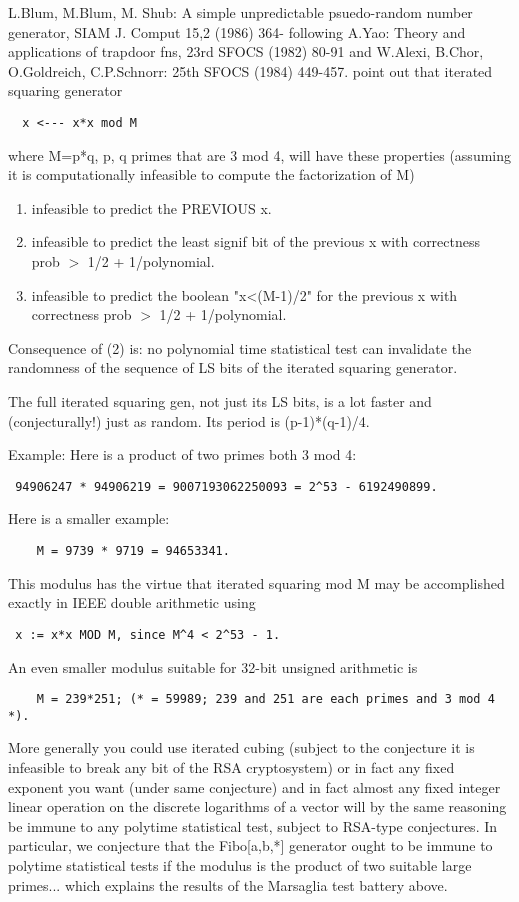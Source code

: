 L.Blum, M.Blum, M. Shub: A simple unpredictable psuedo-random
number generator, SIAM J. Comput 15,2 (1986) 364-
following
A.Yao: Theory and applications of trapdoor fns, 23rd SFOCS (1982) 80-91
and
W.Alexi, B.Chor, O.Goldreich, C.P.Schnorr: 25th SFOCS (1984) 449-457.
point out that iterated squaring generator
\begin{verbatim}
  x <--- x*x mod M
\end{verbatim}
where M=p*q, p, q primes that are 3 mod 4, will have these properties
(assuming it is computationally infeasible to compute the factorization of M)
\begin{enumerate}
\item infeasible to predict the PREVIOUS x.
\item infeasible to predict the least signif bit of the
    previous x with correctness prob $>$ 1/2 + 1/polynomial.
\item infeasible to predict the boolean "x<(M-1)/2" for the
    previous x with correctness prob $>$ 1/2 + 1/polynomial.
\end{enumerate}
Consequence of (2) is: no polynomial time statistical test
can invalidate the randomness of the sequence of LS bits of
the iterated squaring generator. 

The full iterated squaring gen, not just its LS bits,
is a lot faster and (conjecturally!) just as random.
Its period is (p-1)*(q-1)/4.

Example: Here is a product of two primes both 3 mod 4:
\begin{verbatim}
 94906247 * 94906219 = 9007193062250093 = 2^53 - 6192490899.
\end{verbatim}
Here is a smaller example:
\begin{verbatim}
    M = 9739 * 9719 = 94653341.
\end{verbatim}
This modulus has the virtue that iterated squaring mod M
may be accomplished exactly in IEEE double arithmetic using
\begin{verbatim}
 x := x*x MOD M, since M^4 < 2^53 - 1.
\end{verbatim}
An even smaller modulus suitable for 32-bit unsigned arithmetic is
\begin{verbatim}
    M = 239*251; (* = 59989; 239 and 251 are each primes and 3 mod 4 *).
\end{verbatim}

More generally you could use iterated cubing (subject to the conjecture
it is infeasible to break any bit of the RSA cryptosystem) or in fact
any fixed exponent you want (under same conjecture) and in fact almost
any fixed integer linear operation on the discrete logarithms of a vector
will by the same reasoning be immune to any polytime statistical test,
subject to RSA-type conjectures. In particular, we conjecture that the
Fibo[a,b,*] generator ought to be immune to polytime statistical tests
if the modulus is the product of two suitable large primes... which
explains the results of the Marsaglia test battery above.





